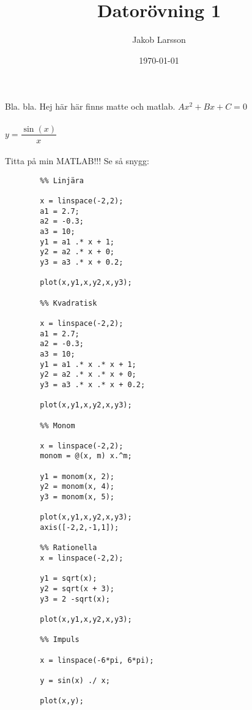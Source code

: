 \documentclass[a4paper,10pt]{article}
\begin{document}
    \title{Datorövning 1}
    \author{Jakob Larsson}
    \date{\today}
    \maketitle{}

    Bla. bla. Hej här här finns matte och matlab.
    $Ax^2 + Bx + C = 0$

    \paragraph{}
    \begin{math}
        y = \dfrac{\sin(x)}{ x}
    \end{math}
    \paragraph{}

    Titta på min MATLAB!!!
    Se så snygg:

    \begin{verbatim}
        %% Linjära

        x = linspace(-2,2);
        a1 = 2.7;
        a2 = -0.3;
        a3 = 10;
        y1 = a1 .* x + 1;
        y2 = a2 .* x + 0;
        y3 = a3 .* x + 0.2;

        plot(x,y1,x,y2,x,y3);

        %% Kvadratisk

        x = linspace(-2,2);
        a1 = 2.7;
        a2 = -0.3;
        a3 = 10;
        y1 = a1 .* x .* x + 1;
        y2 = a2 .* x .* x + 0;
        y3 = a3 .* x .* x + 0.2;

        plot(x,y1,x,y2,x,y3);

        %% Monom

        x = linspace(-2,2);
        monom = @(x, m) x.^m;

        y1 = monom(x, 2);
        y2 = monom(x, 4);
        y3 = monom(x, 5);

        plot(x,y1,x,y2,x,y3);
        axis([-2,2,-1,1]);

        %% Rationella
        x = linspace(-2,2);

        y1 = sqrt(x);
        y2 = sqrt(x + 3);
        y3 = 2 -sqrt(x);

        plot(x,y1,x,y2,x,y3);

        %% Impuls

        x = linspace(-6*pi, 6*pi);

        y = sin(x) ./ x;

        plot(x,y);

    \end{verbatim}
\end{document}
